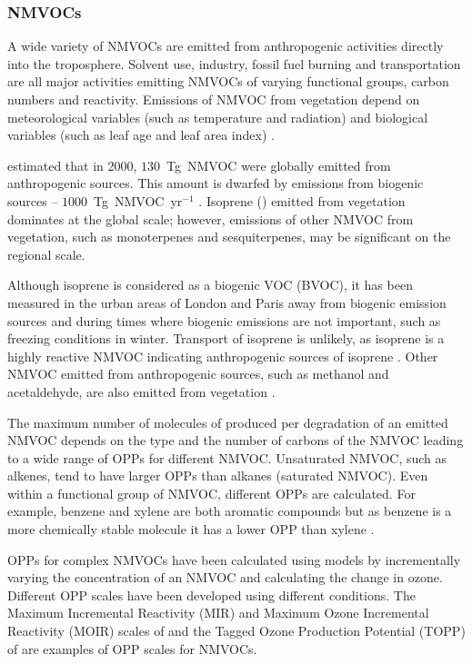 \subsubsection{NMVOCs}
\vspace{-4mm}
A wide variety of NMVOCs are emitted from anthropogenic activities directly into the troposphere.
Solvent use, industry, fossil fuel burning and transportation are all major activities emitting NMVOCs of varying functional groups, carbon numbers and reactivity.
Emissions of NMVOC from vegetation depend on meteorological variables (such as temperature and radiation) and biological variables (such as leaf age and leaf area index) \citep{Guenther:2012}.

\citet{Lamarque:2010} estimated that in 2000, $130$~Tg~NMVOC were globally emitted from anthropogenic sources.
This amount is dwarfed by emissions from biogenic sources -- $1000$~Tg~NMVOC~yr$^{-1}$ \citep{Guenther:2012}.
Isoprene () emitted from vegetation dominates at the global scale; however, emissions of other NMVOC from vegetation, such as monoterpenes and sesquiterpenes, may be significant on the regional scale.

Although isoprene is considered as a biogenic VOC (BVOC), it has been measured in the urban areas of London and Paris away from biogenic emission sources and during times where biogenic emissions are not important, such as freezing conditions in winter.
Transport of isoprene is unlikely, as isoprene is a highly reactive NMVOC indicating anthropogenic sources of isoprene \citep{vonSchneidemesser:2011}.
Other NMVOC emitted from anthropogenic sources, such as methanol and acetaldehyde, are also emitted from vegetation \citep{Guenther:2012}.

The maximum number of molecules of  produced per degradation of an emitted NMVOC depends on the type and the number of carbons of the NMVOC leading to a wide range of OPPs for different NMVOC.
Unsaturated NMVOC, such as alkenes, tend to have larger OPPs than alkanes (saturated NMVOC).
Even within a functional group of NMVOC, different OPPs are calculated.
For example, benzene and xylene are both aromatic compounds but as benzene is a more chemically stable molecule it has a lower OPP than xylene \citep{Carter:1994}.

OPPs for complex NMVOCs have been calculated using models by incrementally varying the concentration of an NMVOC and calculating the change in ozone.
Different OPP scales have been developed using different  conditions.
The Maximum Incremental Reactivity (MIR) and Maximum Ozone Incremental Reactivity (MOIR) scales of \citet{Carter:1994} and the Tagged Ozone Production Potential (TOPP) of \citet{Butler:2011} are examples of OPP scales for NMVOCs.


